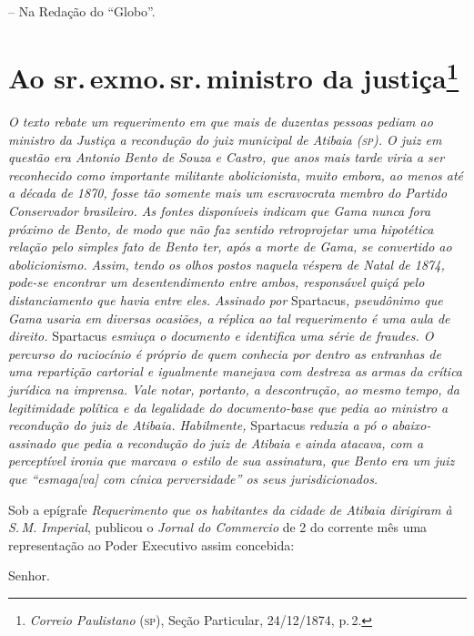 -- Na Redação do ``Globo''.

\chapter{Ao sr.\,exmo.\,sr.\,ministro da justiça\footnote{\emph{Correio Paulistano} (\textsc{sp}), Seção Particular,
  24/12/1874, p.\,2.}} %

\begin{didascalia}
\emph{O texto rebate um requerimento em que mais de duzentas pessoas
pediam ao ministro da Justiça a recondução do juiz municipal de Atibaia
(\textsc{sp}). O juiz em questão era Antonio Bento de Souza e Castro, que anos
mais tarde viria a ser reconhecido como importante militante
abolicionista, muito embora, ao menos até a década de 1870, fosse tão
somente mais um escravocrata membro do Partido Conservador brasileiro.
As fontes disponíveis indicam que Gama nunca fora próximo de Bento, de
modo que não faz sentido retroprojetar uma hipotética relação pelo
simples fato de Bento ter, após a morte de Gama, se convertido ao
abolicionismo. Assim, tendo os olhos postos naquela véspera de Natal de
1874, pode-se encontrar um desentendimento entre ambos, responsável
quiçá pelo distanciamento que havia entre eles. Assinado por}
Spartacus\emph{, pseudônimo que Gama usaria em diversas ocasiões, a
réplica ao tal requerimento é uma aula de direito.} Spartacus
\emph{esmiuça o documento e identifica uma série de fraudes. O percurso
do raciocínio é próprio de quem conhecia por dentro as entranhas de uma
repartição cartorial e igualmente manejava com destreza as armas da
crítica jurídica na imprensa. Vale notar, portanto, a descontrução, ao
mesmo tempo, da legitimidade política e da legalidade do documento-base
que pedia ao ministro a recondução do juiz de Atibaia. Habilmente,}
Spartacus \emph{reduzia a pó o abaixo-assinado que pedia a recondução do
juiz de Atibaia e ainda atacava, com a perceptível ironia que marcava o
estilo de sua assinatura, que Bento era um juiz que ``esmaga{[}va{]} com
cínica perversidade'' os seus jurisdicionados.}
\end{didascalia}

Sob a epígrafe \emph{Requerimento que os habitantes da cidade de Atibaia
dirigiram à S.\,M. Imperial}, publicou o \emph{Jornal do Commercio} de 2
do corrente mês uma representação ao Poder Executivo assim concebida:

Senhor.

